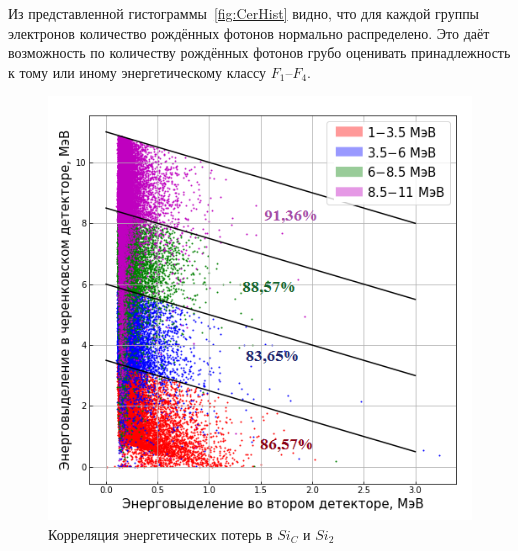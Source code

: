 \documentclass[12pt,a4paper]{report} %
\begin{document}
Из представленной гистограммы~\ref{fig:CerHist}\afterpage{\clearpage} видно, что для каждой группы электронов количество рождённых фотонов нормально распределено. Это даёт возможность по количеству рождённых фотонов грубо оценивать принадлежность к тому или иному энергетическому классу $F_1$--$F_4$.
\begin{figure}[th]
	\begin{center}
		\includegraphics[scale=0.5]{pictures/GEANT/Si2CorrPlotWalls.png}
		\caption{Корреляция энергетических потерь в $Si_C$ и $Si_2$}
		\label{fig:Si2CorrPlot}
	\end{center}
\end{figure}
\end{document}
